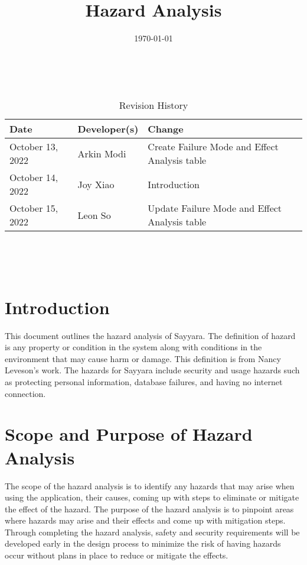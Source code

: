 \documentclass{article}
\title{Hazard Analysis\\\progname}
\author{\authname}
\date{\today}
\begin{document}
\maketitle
\thispagestyle{empty}

~\newpage


\begin{table}[hp]
	\caption{Revision History} \label{TblRevisionHistory}
	\begin{tabularx}{\textwidth}{llX}
		\toprule
		\textbf{Date}    & \textbf{Developer(s)} & \textbf{Change}                               \\
		\midrule
		October 13, 2022 & Arkin Modi            & Create Failure Mode and Effect Analysis table \\
		October 14, 2022 & Joy Xiao              & Introduction                                  \\
		October 15, 2022 & Leon So               & Update Failure Mode and Effect Analysis table \\
		\bottomrule
	\end{tabularx}
\end{table}

~\newpage

\tableofcontents

~\newpage



\section{Introduction}
This document outlines the hazard analysis of Sayyara. The definition of hazard is any property or
condition in the system along with conditions in the environment that may cause harm or damage.
This definition is from Nancy Leveson's work. The hazards for Sayyara include security and usage
hazards such as protecting personal information, database failures, and having no internet
connection.

\section{Scope and Purpose of Hazard Analysis}
The scope of the hazard analysis is to identify any hazards that may arise when using the
application, their causes, coming up with steps to eliminate or mitigate the effect of the hazard.
The purpose of the hazard analysis is to pinpoint areas where hazards may arise and their effects
and come up with mitigation steps. Through completing the hazard analysis, safety and security
requirements will be developed early in the design process to minimize the risk of having hazards
occur without plans in place to reduce or mitigate the effects.
\end{document}

